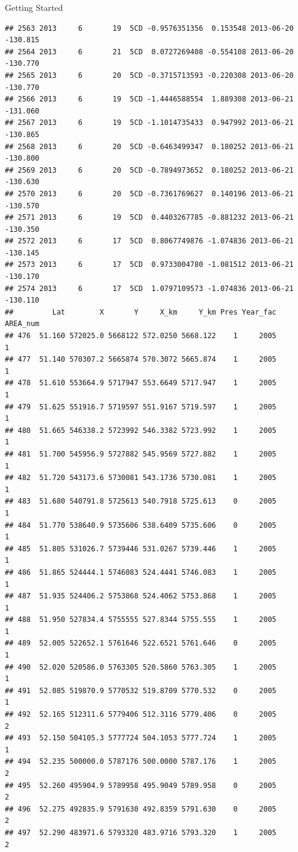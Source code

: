 \documentclass[
  ignorenonframetext,
]{beamer}
\begin{document}
\begin{frame}[fragile]{Getting Started}
\begin{verbatim}
## 2563 2013     6       19  5CD -0.9576351356  0.153548 2013-06-20 -130.815
## 2564 2013     6       21  5CD  0.0727269408 -0.554108 2013-06-20 -130.770
## 2565 2013     6       20  5CD -0.3715713593 -0.220308 2013-06-20 -130.770
## 2566 2013     6       19  5CD -1.4446588554  1.889308 2013-06-21 -131.060
## 2567 2013     6       19  5CD -1.1014735433  0.947992 2013-06-21 -130.865
## 2568 2013     6       20  5CD -0.6463499347  0.180252 2013-06-21 -130.800
## 2569 2013     6       20  5CD -0.7894973652  0.180252 2013-06-21 -130.630
## 2570 2013     6       20  5CD -0.7361769627  0.140196 2013-06-21 -130.570
## 2571 2013     6       19  5CD  0.4403267785 -0.881232 2013-06-21 -130.350
## 2572 2013     6       17  5CD  0.8067749876 -1.074836 2013-06-21 -130.145
## 2573 2013     6       17  5CD  0.9733004780 -1.081512 2013-06-21 -130.170
## 2574 2013     6       17  5CD  1.0797109573 -1.074836 2013-06-21 -130.110
##         Lat        X       Y     X_km     Y_km Pres Year_fac AREA_num
## 476  51.160 572025.0 5668122 572.0250 5668.122    1     2005        1
## 477  51.140 570307.2 5665874 570.3072 5665.874    1     2005        1
## 478  51.610 553664.9 5717947 553.6649 5717.947    1     2005        1
## 479  51.625 551916.7 5719597 551.9167 5719.597    1     2005        1
## 480  51.665 546338.2 5723992 546.3382 5723.992    1     2005        1
## 481  51.700 545956.9 5727882 545.9569 5727.882    1     2005        1
## 482  51.720 543173.6 5730081 543.1736 5730.081    1     2005        1
## 483  51.680 540791.8 5725613 540.7918 5725.613    0     2005        1
## 484  51.770 538640.9 5735606 538.6409 5735.606    0     2005        1
## 485  51.805 531026.7 5739446 531.0267 5739.446    1     2005        1
## 486  51.865 524444.1 5746083 524.4441 5746.083    1     2005        1
## 487  51.935 524406.2 5753868 524.4062 5753.868    1     2005        1
## 488  51.950 527834.4 5755555 527.8344 5755.555    1     2005        1
## 489  52.005 522652.1 5761646 522.6521 5761.646    0     2005        1
## 490  52.020 520586.0 5763305 520.5860 5763.305    1     2005        1
## 491  52.085 519870.9 5770532 519.8709 5770.532    0     2005        1
## 492  52.165 512311.6 5779406 512.3116 5779.406    0     2005        2
## 493  52.150 504105.3 5777724 504.1053 5777.724    1     2005        1
## 494  52.235 500000.0 5787176 500.0000 5787.176    1     2005        2
## 495  52.260 495904.9 5789958 495.9049 5789.958    0     2005        2
## 496  52.275 492835.9 5791630 492.8359 5791.630    0     2005        2
## 497  52.290 483971.6 5793320 483.9716 5793.320    1     2005        2

\end{verbatim}
\end{frame}
\end{document}
